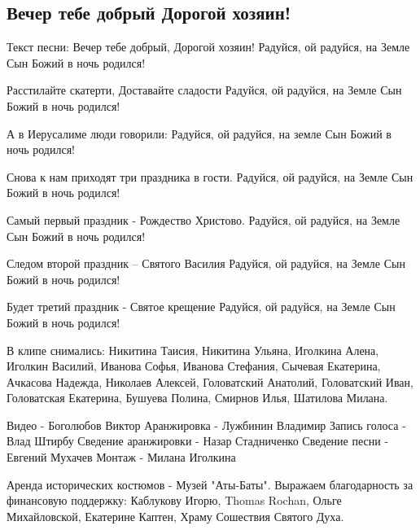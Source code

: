  
 
 
 
 

\subsection{Вечер тебе добрый Дорогой хозяин!}

Текст песни: 
Вечер тебе добрый,
Дорогой хозяин!
Радуйся, ой радуйся, на Земле
Сын Божий в ночь родился!

Расстилайте скатерти,
Доставайте сладости
Радуйся, ой радуйся, на Земле
Сын Божий в ночь родился!

А в Иерусалиме люди говорили:
Радуйся, ой радуйся, на земле
Сын Божий в ночь родился!

Снова к нам приходят три праздника в гости.
Радуйся, ой радуйся, на Земле
Сын Божий в ночь родился!

Самый первый праздник - Рождество Христово.
Радуйся, ой радуйся, на Земле
Сын Божий в ночь родился!

Следом второй праздник – Святого Василия
Радуйся, ой радуйся, на Земле
Сын Божий в ночь родился!

Будет третий праздник - 
Святое крещение
Радуйся, ой радуйся, на Земле
Сын Божий в ночь родился!

В клипе снимались: Никитина Таисия, Никитина Ульяна, Иголкина Алена, Иголкин Василий, Иванова Софья, Иванова Стефания, Сычевая Екатерина, Ачкасова Надежда, Николаев Алексей, Головатский Анатолий, Головатский Иван, Головатская Екатерина, Бушуева Полина, Смирнов Илья, Шатилова Милана. 

Видео - Боголюбов Виктор
Аранжировка - Лужбинин Владимир
Запись голоса - Влад Штирбу
Сведение аранжировки - Назар Стадниченко
Сведение песни - Евгений Мухачев
Монтаж - Милана Иголкина

Аренда исторических костюмов - Музей "Аты-Баты".
Выражаем благодарность за финансовую поддержку: Каблукову Игорю, Thomas Rochan, Ольге Михайловской, Екатерине Каптен, Храму Сошествия Святого Духа.
